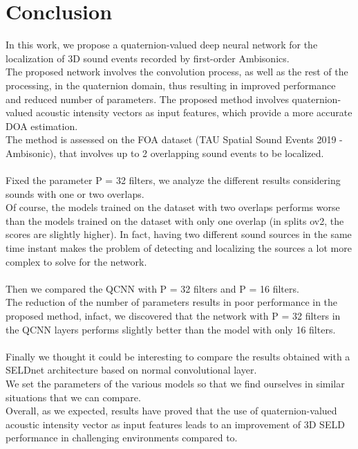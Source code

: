 \documentclass{article}
\begin{document}
    \section{Conclusion}
    In this work, we propose a quaternion-valued deep neural network for the localization of 3D sound events recorded by first-order Ambisonics.\\
    The proposed network involves the convolution process, as well as the rest of the processing, in the quaternion domain, thus resulting in improved performance and reduced number of parameters. The proposed method involves quaternion-valued acoustic intensity vectors as input features, which provide a more accurate DOA estimation.\\
    The method is assessed on the FOA dataset (TAU Spatial Sound Events 2019 - Ambisonic), that involves up to 2 overlapping sound events to be localized.\\
    \\
    Fixed the parameter P = 32 filters, we analyze the different results considering sounds with one or two overlaps.\\
    Of course, the models trained on the dataset with two overlaps performs worse than the models trained on the dataset with only one overlap (in splits ov2, the scores are slightly higher). In fact, having two different sound sources in the same time instant makes the problem of detecting and localizing the sources a lot more complex to solve for the network.\\
    \\
    Then we compared the QCNN with P = 32 filters and P = 16 filters.\\
    The reduction of the number of parameters results in poor performance in the proposed method, infact, we discovered that the network with P = 32 filters in the QCNN layers performs slightly better than the model with only 16 filters.\\
    \\ 
    Finally we thought it could be interesting to compare the results obtained with a SELDnet architecture based on normal convolutional layer.\\
    We set the parameters of the various models so that we find ourselves in similar situations that we can compare.\\
    Overall, as we expected, results have proved that the use of quaternion-valued acoustic intensity vector as input features leads to an improvement of 3D SELD performance in challenging environments compared to.\\
\end{document}
